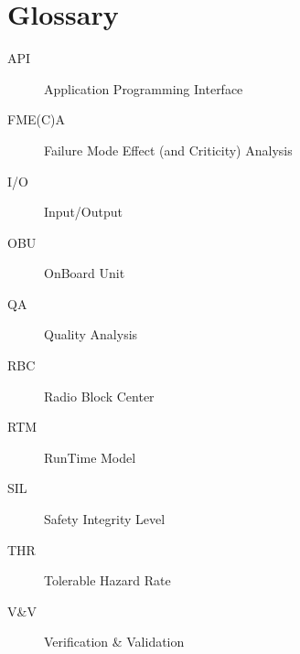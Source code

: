 \documentclass{template/openetcs_article}
\begin{document}
\section{Glossary}
\begin{description}
\item[API] Application Programming Interface
\item[FME(C)A] Failure Mode Effect (and Criticity) Analysis
\item[I/O] Input/Output
\item[OBU] OnBoard Unit
\item[QA] Quality Analysis
\item[RBC] Radio Block Center
\item[RTM] RunTime Model
\item[SIL] Safety Integrity Level
\item[THR] Tolerable Hazard Rate
\item[V\&V] Verification \& Validation
\end{description}











\nocite{*}








\end{document}

